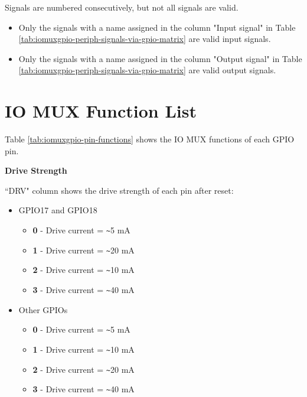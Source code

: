\documentclass[main\_\_EN.tex]{subfiles}
\begin{document}
\begin{tiplisting}
Signals are numbered consecutively, but not all signals are valid.
\vspace{-1em}
\begin{itemize}
    \item Only the signals with a name assigned in the column "Input signal" in Table \ref{tab:iomuxgpio-periph-signals-via-gpio-matrix} are valid input signals.
    \item Only the signals with a name assigned in the column "Output signal" in Table \ref{tab:iomuxgpio-periph-signals-via-gpio-matrix} are valid output signals.
\end{itemize}
\end{tiplisting}

\begin{landscape}



\end{landscape}
\section{IO MUX Function List}
\label{sec:iomux_pads}
Table \ref{tab:iomuxgpio-pin-functions} shows the IO MUX functions of each GPIO pin.



\textbf{Drive Strength}

``DRV" column shows the drive strength of each pin after reset:
\begin{itemize}
    \item GPIO17 and GPIO18
    \begin{itemize}
        \item \textbf{0} - Drive current = \verb+~+5 mA
        \item \textbf{1} - Drive current = \verb+~+20 mA
        \item \textbf{2} - Drive current = \verb+~+10 mA
        \item \textbf{3} - Drive current = \verb+~+40 mA
    \end{itemize}
    \item Other GPIOs
    \begin{itemize}
        \item \textbf{0} - Drive current = \verb+~+5 mA
        \item \textbf{1} - Drive current = \verb+~+10 mA
        \item \textbf{2} - Drive current = \verb+~+20 mA
        \item \textbf{3} - Drive current = \verb+~+40 mA
    \end{itemize}
\end{itemize}
\end{document}
